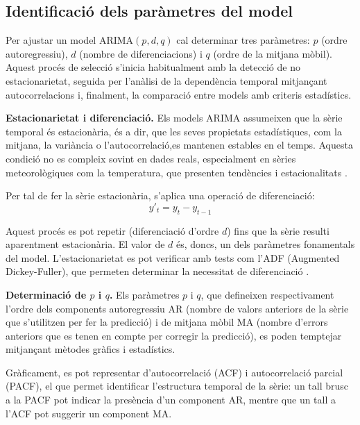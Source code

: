 \documentclass[../main.tex]{subfiles}
\begin{document}
\subsection{Identificació dels paràmetres del model}

Per ajustar un model ARIMA$(p,d,q)$ cal determinar tres paràmetres: $p$ (ordre autoregressiu), $d$ (nombre de diferenciacions) i $q$ (ordre de la mitjana mòbil). Aquest procés de selecció s’inicia habitualment amb la detecció de no estacionarietat, seguida per l’anàlisi de la dependència temporal mitjançant autocorrelacions i, finalment, la comparació entre models amb criteris estadístics.

\vspace{0.5em}
\noindent\textbf{Estacionarietat i diferenciació.}  
Els models ARIMA assumeixen que la sèrie temporal és estacionària, és a dir, que les seves propietats estadístiques, com la mitjana, la variància o l’autocorrelació,es mantenen estables en el temps. Aquesta condició no es compleix sovint en dades reals, especialment en sèries meteorològiques com la temperatura, que presenten tendències i estacionalitats \parencite{de2020comparison}.

Per tal de fer la sèrie estacionària, s’aplica una operació de diferenciació:
\begin{equation}
y'_t = y_t - y_{t-1}
\end{equation}

Aquest procés es pot repetir (diferenciació d’ordre $d$) fins que la sèrie resulti aparentment estacionària. El valor de $d$ és, doncs, un dels paràmetres fonamentals del model. L’estacionarietat es pot verificar amb tests com l’ADF (Augmented Dickey-Fuller), que permeten determinar la necessitat de diferenciació \parencite{koccak2023time}.

\vspace{0.5em}
\noindent\textbf{Determinació de $p$ i $q$.}  
Els paràmetres $p$ i $q$, que defineixen respectivament l’ordre dels components autoregressiu AR (nombre de valors anteriors de la sèrie que s’utilitzen per fer la predicció) i de mitjana mòbil MA (nombre d’errors anteriors que es tenen en compte per corregir la predicció), es poden temptejar mitjançant mètodes gràfics i estadístics.

Gràficament, es pot representar d’autocorrelació (ACF) i autocorrelació parcial (PACF), el que permet identificar l’estructura temporal de la sèrie: un tall brusc a la PACF pot indicar la presència d’un component AR, mentre que un tall a l’ACF pot suggerir un component MA. 
\end{document}
